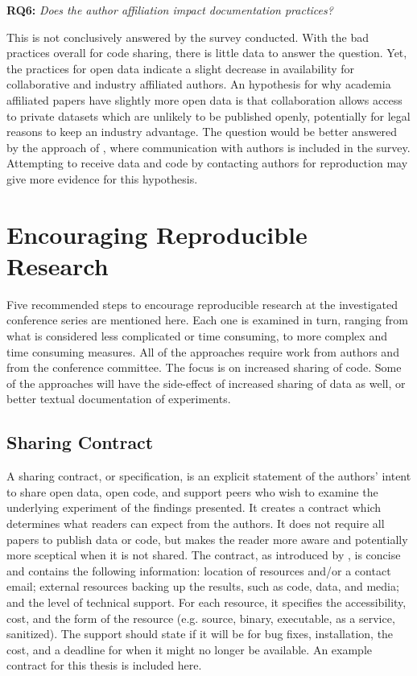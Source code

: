 \textbf{RQ6:} \emph{Does the author affiliation impact documentation practices?}

This is not conclusively answered by the survey conducted. With the bad practices overall for code sharing, there is little data to answer the question. Yet, the practices for open data indicate a slight decrease in availability for collaborative and industry affiliated authors. An hypothesis for why academia affiliated papers have slightly more open data is that collaboration allows access to private datasets which are unlikely to be published openly, potentially for legal reasons to keep an industry advantage. The question would be better answered by the approach of \cite{Collberg2016}, where communication with authors is included in the survey. Attempting to receive data and code by contacting authors for reproduction may give more evidence for this hypothesis.

\section{Encouraging Reproducible Research}
\label{sec:incentives}
Five recommended steps to encourage reproducible research at the investigated conference series are mentioned here. Each one is examined in turn, ranging from what is considered less complicated or time consuming, to more complex and time consuming measures. All of the approaches require work from authors and from the conference committee. The focus is on increased sharing of code. Some of the approaches will have the side-effect of increased sharing of data as well, or better textual documentation of experiments.

\subsection{Sharing Contract}
A sharing contract, or specification, is an explicit statement of the authors' intent to share open data, open code, and support peers who wish to examine the underlying experiment of the findings presented. It creates a contract which determines what readers can expect from the authors. It does not require all papers to publish data or code, but makes the reader more aware and potentially more sceptical when it is not shared. The contract, as introduced by \cite{Collberg2016}, is concise and contains the following information: location of resources and/or a contact email; external resources backing up the results, such as code, data, and media; and the level of technical support. For each resource, it specifies the accessibility, cost, and the form of the resource (e.g. source, binary, executable, as a service, sanitized). The support should state if it will be for bug fixes, installation, the cost, and a deadline for when it might no longer be available. An example contract for this thesis is included here.

